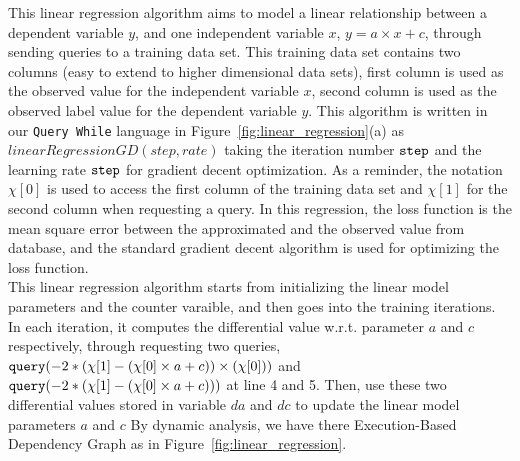 This linear regression algorithm 
aims to
model a linear relationship between a dependent variable $y$,
and one independent variable $x$, $y = a \times x + c$,
through sending queries to a training data set.
This training data set contains two columns (easy to extend to higher dimensional data sets), first column is used as the observed value for the independent variable $x$,
second column is used as the observed label value for the dependent variable $y$.
This algorithm is written in our {\tt Query While} language in Figure~\ref{fig:linear_regression}(a) as $linearRegressionGD(step, rate)$ taking the iteration number $\mathtt{step}$ 
and the learning rate $\mathtt{step}$ for gradient decent optimization.
As a reminder,
the notation 
$\chi[0]$ is used to access the first column of the training data set
and $\chi[1]$ for 
the second column when requesting a query.
In this regression, the loss function is the mean square error between the approximated and the observed value from database,
and the standard gradient decent algorithm is used for optimizing the loss function.
%
\\
This linear regression algorithm starts from initializing the linear model parameters and the counter varaible,
and then goes into the training iterations.
In each iteration, it computes the differential value w.r.t. parameter
$a$ and $c$ respectively,
through requesting two queries, ${\tt query}(-2 * (\chi[1] - (\chi[0]\times a + c)) \times (\chi[0]))$ and 
${\tt query}(-2 * (\chi[1] - (\chi[0]\times a + c)))$
at line 4 and 5.
Then, use these two differential values stored in variable $da$ and $dc$ to update the linear model parameters $a$ and $c$ 
%
By dynamic analysis, we have there Execution-Based Dependency Graph as in Figure~\ref{fig:linear_regression}.
